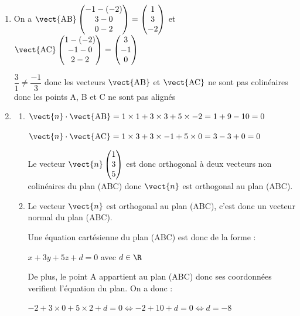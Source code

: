 \medskip

\begin{enumerate}
	\item

On a $ \vect{\mathrm{AB}}  \begin{pmatrix}	-1 - (-2)\\ 3-0 \\ 0-2 \end{pmatrix} = \begin{pmatrix}	1\\ 3 \\ -2 \end{pmatrix}$
	et $ \vect{\mathrm{AC}}  \begin{pmatrix}	1 - (-2)\\ -1-0 \\ 2-2 \end{pmatrix} = \begin{pmatrix}	3\\ -1 \\ 0 \end{pmatrix}$

$\dfrac{3}{1}\neq \dfrac{-1}{3}$ donc les vecteurs  $ \vect{\mathrm{AB}} $ et  $ \vect{\mathrm{AC}} $ ne sont pas colinéaires donc les points A, B et C ne sont pas alignés
		\item
		\begin{enumerate}
			\item
$\vect{n} \cdot \vect{\mathrm{AB}}= 1 \times 1 + 3 \times 3 + 5 \times -2 = 1 +9 -10=0$

$\vect{n} \cdot \vect{\mathrm{AC}}= 1 \times 3 + 3 \times -1 + 5 \times 0 =3-3+0=0$

Le vecteur $\vect{n}\begin{pmatrix}1 \\ 3 \\ 5\end{pmatrix}$ est donc orthogonal à deux vecteurs non colinéaires du plan (ABC) donc $\vect{n}$ est orthogonal au plan (ABC).

		\item  Le vecteur $\vect{n}$ est orthogonal au plan (ABC), c'est donc un vecteur normal du plan (ABC).

Une équation cartésienne du plan (ABC) est donc de la forme :

$x+3y+5z+d=0$ avec $d\in\R$

De plus, le point A appartient au plan (ABC) donc ses coordonnées verifient l'équation du plan. On a donc :

$-2 +3\times 0 + 5\times 2 +d=0 \Longleftrightarrow -2+10+d=0 \Longleftrightarrow d=-8$


\end{enumerate}
\end{enumerate}
